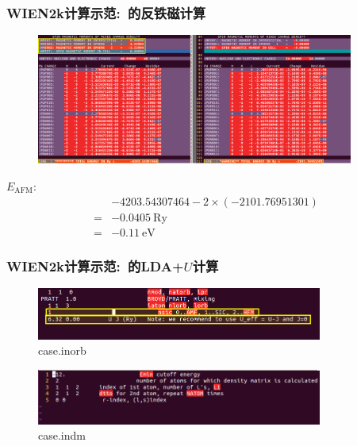 \documentclass[cjk,slidestop,compress,mathserif,blue]{beamer}
\begin{document}
\frame
{
	\frametitle{\textrm{WIEN2k}计算示范:~的反铁磁计算}
\vspace*{-8pt}
\begin{figure}[h!]
\centering
\includegraphics[width=4.1in]{Figures/WIEN2k_AFM_Cr-6.png}
\label{Fig:WIEN2k_AFM-Cr-6}
\end{figure}
$E_{\mathrm{AFM}}$:
\begin{displaymath}
	\begin{aligned}
		&-4203.54307464-2\times(-2101.76951301)\\
		=&-0.0405~\mathrm{Ry}\\
		=&-0.11~\mathrm{eV}
	\end{aligned}
\end{displaymath}
}

\frame
{
	\frametitle{\textrm{WIEN2k}计算示范:~的\textrm{LDA+$U$}计算}
\vspace*{-2pt}
\begin{figure}[h!]
\centering
\includegraphics[width=3.7in]{Figures/WIEN2k_EuB6-inorb.png}
\caption{\tiny \textrm{case.inorb}}%
\label{Fig:WIEN2k_EuB6-inbor}
\end{figure}
\begin{figure}[h!]
\centering
\includegraphics[width=3.70in]{Figures/WIEN2k-indm.png}
\caption{\tiny \textrm{case.indm}}%
\label{Fig:WIEN2k_indm}
\end{figure}
}
\end{document}
